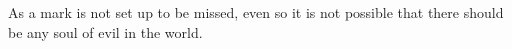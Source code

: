 As a mark  is not set up  to be missed, even  so it is not  possible that there
should be any soul of evil in the world.
